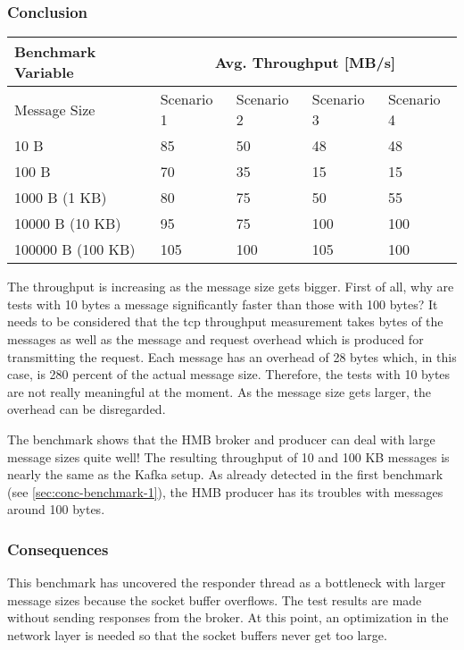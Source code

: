 \newpage
\subsubsection{Conclusion}
\begin{table}[H]
\centering
\begin{tabular}{|l|l|l|l|l|}
\hline
{\bf Benchmark Variable} & \multicolumn{4}{c|}{{\bf Avg. Throughput {[}MB/s{]}}} \\ \hline
Message Size             & Scenario 1       & Scenario 2       & Scenario 3     & Scenario 4 \\ \hline
10 B                     & 85               & 50               & 48             & 48         \\ \hline
100 B                    & 70               & 35               & 15             & 15         \\ \hline
1000 B (1 KB)            & 80               & 75               & 50             & 55         \\ \hline
10000 B (10 KB)          & 95               & 75               & 100            & 100         \\ \hline
100000 B (100 KB)        & 105              & 100              & 105            & 100         \\ \hline
\end{tabular}
\end{table}


The throughput is increasing as the message size gets bigger. First of
all, why are tests with 10 bytes a message significantly faster than those with
100 bytes? It needs to be considered that the tcp throughput measurement takes
bytes of the messages as well as the message and request overhead which is
produced for transmitting the request. Each message has an overhead of 28 bytes
which, in this case, is 280 percent of the actual message size. Therefore, the
tests with 10 bytes are not really meaningful at the moment. As the message
size gets larger, the overhead can be disregarded.

The benchmark shows that the HMB broker and producer can deal with large
message sizes quite well! The resulting throughput of 10 and 100 KB messages
is nearly the same as the Kafka setup. As already detected in the first benchmark
(see \ref{sec:conc-benchmark-1}), the HMB producer has its troubles with messages
around 100 bytes.

\subsubsection{Consequences}
This benchmark has uncovered the responder thread as a bottleneck with larger
message sizes because the socket buffer overflows. The test results are
made without sending responses from the broker. At this point, an optimization
in the network layer is needed so that the socket buffers never get too large.

